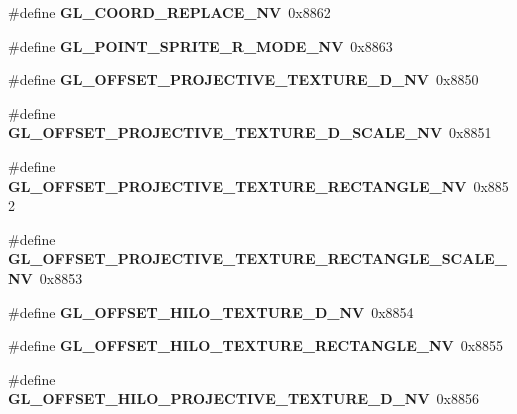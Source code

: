 \begin{DoxyCompactItemize}
\item 
\#define {\bfseries G\+L\+\_\+\+C\+O\+O\+R\+D\+\_\+\+R\+E\+P\+L\+A\+C\+E\+\_\+\+N\+V}~0x8862\label{_s_d_l__opengl_8h_ae29ff075e26f8e333c785c23a4c23cf7}

\item 
\#define {\bfseries G\+L\+\_\+\+P\+O\+I\+N\+T\+\_\+\+S\+P\+R\+I\+T\+E\+\_\+\+R\+\_\+\+M\+O\+D\+E\+\_\+\+N\+V}~0x8863\label{_s_d_l__opengl_8h_aeea553f994d259159f2fc77b2816bb9d}

\item 
\#define {\bfseries G\+L\+\_\+\+O\+F\+F\+S\+E\+T\+\_\+\+P\+R\+O\+J\+E\+C\+T\+I\+V\+E\+\_\+\+T\+E\+X\+T\+U\+R\+E\+\_\+D\+\_\+\+N\+V}~0x8850\label{_s_d_l__opengl_8h_aec9b90753b27923b2963cbbec93314aa}

\item 
\#define {\bfseries G\+L\+\_\+\+O\+F\+F\+S\+E\+T\+\_\+\+P\+R\+O\+J\+E\+C\+T\+I\+V\+E\+\_\+\+T\+E\+X\+T\+U\+R\+E\+\_\+D\+\_\+\+S\+C\+A\+L\+E\+\_\+\+N\+V}~0x8851\label{_s_d_l__opengl_8h_a642711adcf77dd962b71430b120cbf74}

\item 
\#define {\bfseries G\+L\+\_\+\+O\+F\+F\+S\+E\+T\+\_\+\+P\+R\+O\+J\+E\+C\+T\+I\+V\+E\+\_\+\+T\+E\+X\+T\+U\+R\+E\+\_\+\+R\+E\+C\+T\+A\+N\+G\+L\+E\+\_\+\+N\+V}~0x8852\label{_s_d_l__opengl_8h_a6a3b8298af2ac6f439b7b8ba8db89901}

\item 
\#define {\bfseries G\+L\+\_\+\+O\+F\+F\+S\+E\+T\+\_\+\+P\+R\+O\+J\+E\+C\+T\+I\+V\+E\+\_\+\+T\+E\+X\+T\+U\+R\+E\+\_\+\+R\+E\+C\+T\+A\+N\+G\+L\+E\+\_\+\+S\+C\+A\+L\+E\+\_\+\+N\+V}~0x8853\label{_s_d_l__opengl_8h_ab1e5db326097d1a32bc7d68bfaab6dab}

\item 
\#define {\bfseries G\+L\+\_\+\+O\+F\+F\+S\+E\+T\+\_\+\+H\+I\+L\+O\+\_\+\+T\+E\+X\+T\+U\+R\+E\+\_\+D\+\_\+\+N\+V}~0x8854\label{_s_d_l__opengl_8h_ade03a04a71e28b97e6e420e59eb4da9e}

\item 
\#define {\bfseries G\+L\+\_\+\+O\+F\+F\+S\+E\+T\+\_\+\+H\+I\+L\+O\+\_\+\+T\+E\+X\+T\+U\+R\+E\+\_\+\+R\+E\+C\+T\+A\+N\+G\+L\+E\+\_\+\+N\+V}~0x8855\label{_s_d_l__opengl_8h_abbc3efb4a2fcd2b735b579dc656ba6cb}

\item 
\#define {\bfseries G\+L\+\_\+\+O\+F\+F\+S\+E\+T\+\_\+\+H\+I\+L\+O\+\_\+\+P\+R\+O\+J\+E\+C\+T\+I\+V\+E\+\_\+\+T\+E\+X\+T\+U\+R\+E\+\_\+D\+\_\+\+N\+V}~0x8856\label{_s_d_l__opengl_8h_a13cde4e810b26c0d8cb6caf56ea33703}


\end{DoxyCompactItemize}
